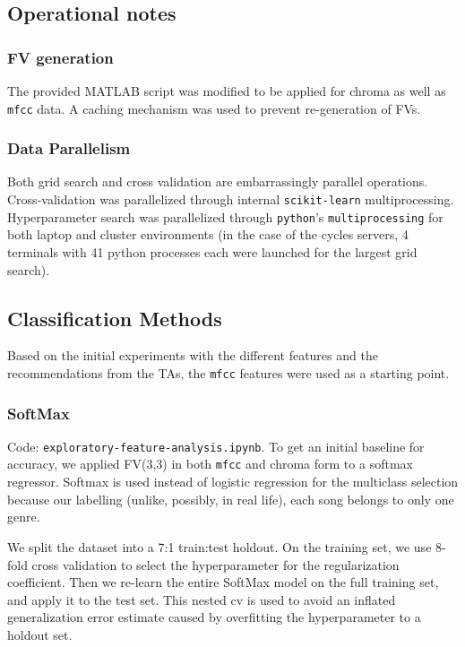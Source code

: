\documentclass[9pt]{article}
\begin{document}
\subsection{Operational notes}

\subsubsection{FV generation}

The provided MATLAB script was modified to be applied for chroma as well as \texttt{mfcc} data. A caching mechanism was used to prevent re-generation of FVs.

\subsubsection{Data Parallelism}

Both grid search and cross validation are embarrassingly parallel operations. Cross-validation was parallelized through internal \texttt{scikit-learn} multiprocessing. Hyperparameter search was parallelized through \texttt{python}'s \texttt{multiprocessing} for both laptop and cluster environments (in the case of the cycles servers, 4 terminals with 41 python processes each were launched for the largest grid search).

\subsection{Classification Methods}

Based on the initial experiments with the different features and the recommendations from the TAs, the \texttt{mfcc} features were used as a starting point.

\subsubsection{SoftMax}

Code: \texttt{exploratory-feature-analysis.ipynb}. To get an initial baseline for accuracy, we applied FV(3,3) in both \texttt{mfcc} and chroma form to a softmax regressor. Softmax is used instead of logistic regression for the multiclass selection because our labelling (unlike, possibly, in real life), each song belongs to only one genre.

We split the dataset into a 7:1 train:test holdout. On the training set, we use 8-fold cross validation to select the hyperparameter for the regularization coefficient. Then we re-learn the entire SoftMax model on the full training set, and apply it to the test set. This nested cv is used to avoid an inflated generalization error estimate caused by overfitting the hyperparameter to a holdout set.
\end{document}
